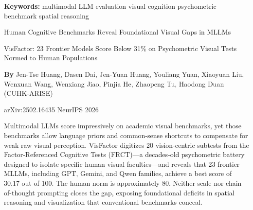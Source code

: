 \documentclass[10pt,twocolumn]{article}
\begin{document}
\setlength{\parindent}{0pt}
\setlength{\parskip}{4pt}

{\small\color{keywordgray}\textbf{Keywords:}
  multimodal LLM evaluation \textbullet{}
  visual cognition \textbullet{}
  psychometric benchmark \textbullet{}
  spatial reasoning}\par\vspace{4pt}

{\LARGE\bfseries\raggedright
  Human Cognitive Benchmarks Reveal Foundational Visual Gaps
  in MLLMs}\par\vspace{4pt}

{\large\itshape\raggedright
  VisFactor: 23 Frontier Models Score Below 31\% on Psychometric Visual
  Tests Normed to Human Populations}\par\vspace{6pt}

{\small\textbf{By} Jen-Tse Huang, Dasen Dai, Jen-Yuan Huang, Youliang Yuan,
  Xiaoyuan Liu, Wenxuan Wang, Wenxiang Jiao, Pinjia He, Zhaopeng Tu,
  Haodong Duan (CUHK-ARISE)}\par\vspace{2pt}

{\small\color{keywordgray}arXiv:2502.16435 \textbullet{}
  NeurIPS 2026}
\par\vspace{2pt}\noindent{\color{rulered}\rule{\columnwidth}{0.6pt}}\vspace{6pt}

Multimodal LLMs score impressively on academic visual benchmarks, yet
those benchmarks allow language priors and common-sense shortcuts to
compensate for weak raw visual perception. VisFactor digitizes 20
vision-centric subtests from the Factor-Referenced Cognitive Tests
(FRCT)---a decades-old psychometric battery designed to isolate specific
human visual faculties---and reveals that 23 frontier MLLMs, including
GPT, Gemini, and Qwen families, achieve a best score of 30.17 out of
100. The human norm is approximately 80. Neither scale nor
chain-of-thought prompting closes the gap, exposing foundational
deficits in spatial reasoning and visualization that conventional
benchmarks conceal.
\end{document}
